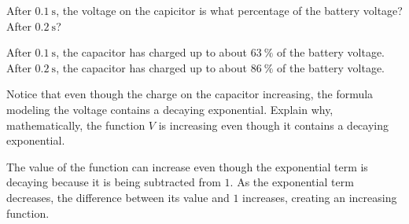 \begin{exercises}
\begin{problem}
\begin{subproblem}
\begin{shortsolution}
	\end{shortsolution}
\end{subproblem}
\begin{subproblem}
	After $\SI{0.1}{\second}$, the voltage on the capicitor is 
	what percentage of the battery voltage? After $\SI{0.2}{\second}$?
	\begin{shortsolution}
		After $\SI{0.1}{\second}$, the capacitor has charged up to about
		$\SI{63}{\percent}$ of the battery voltage. After $\SI{0.2}{\second}$,
		the capacitor has charged up to about $\SI{86}{\percent}$ of the 
		battery voltage.
	\end{shortsolution}
\end{subproblem}
\begin{subproblem}
	Notice that even though the charge on the capacitor increasing, the formula modeling
	the voltage contains a decaying exponential. Explain why, mathematically, the function $V$ is
	increasing even though it contains a decaying exponential.
	\begin{shortsolution}
		The value of the function can increase even though the exponential term is decaying
		because it is being subtracted from $1$. As the exponential term decreases, the difference
		between its value and $1$ increases, creating an increasing function.
	\end{shortsolution}
\end{subproblem}
\end{problem}
			

\end{exercises}
